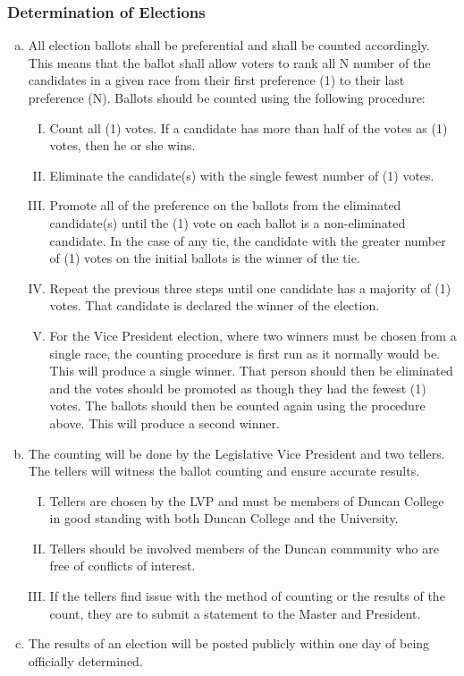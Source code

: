 \documentclass[USletter,12pt]{article}
\begin{document}
\begin{enumerate}[(a)]
\subsubsection{Determination of Elections}
\begin{enumerate}[(a)]
\item All election ballots shall be preferential and shall be counted accordingly.  This means that the ballot shall allow voters to rank all N number of the candidates in a given race from their first preference (1) to their last preference (N).  Ballots should be counted using the following procedure:
	\begin{enumerate}[(I)]
	\item Count all (1) votes.  If a candidate has more than half of the votes as (1) votes, then he or she wins.
	\item Eliminate the candidate(s) with the single fewest number of (1) votes.
	\item Promote all of the preference on the ballots from the eliminated candidate(s) until the (1) vote on each ballot is a non-eliminated candidate.  In the case of any tie, the candidate with the greater number of (1) votes on the initial ballots is the winner of the tie.
	\item Repeat the previous three steps until one candidate has a majority of (1) votes.  That candidate is declared the winner of the election.  
	\item For the Vice President election, where two winners must be chosen from a single race, the counting procedure is first run as it normally would be.  This will produce a single winner.  That person should then be eliminated and the votes should be promoted as though they had the fewest (1) votes.  The ballots should then be counted again using the procedure above.  This will produce a second winner.
	\end{enumerate}
\item The counting will be done by the Legislative Vice President and two tellers.  The tellers will witness the ballot counting and ensure accurate results.
	\begin{enumerate}[(I)]
	\item Tellers are chosen by the LVP and must be members of Duncan College in good standing with both Duncan College and the University.
	\item Tellers should be involved members of the Duncan community who are free of conflicts of interest.
	\item If the tellers find issue with the method of counting or the results of the count, they are to submit a statement to the Master and President.
	\end{enumerate}
\item The results of an election will be posted publicly within one day of being officially determined.
\end{enumerate}


\end{enumerate}
\end{document}

